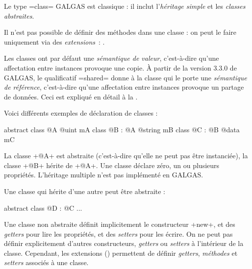 

Le type \ggs=class= GALGAS est classique : il inclut l'\emph{héritage simple} et les \emph{classes abstraites}.

Il n'est pas possible de définir des méthodes dans une classe : on peut le faire uniquement via des \emph{extensions}~: .

Les classes ont par défaut une \emph{sémantique de valeur}, c'est-à-dire qu'une affectation entre instances provoque une copie. À partir de la version 3.3.0 de GALGAS, le qualificatif \ggs=shared= donne à la classe qui le porte une \emph{sémantique de référence}, c'est-à-dire qu'une affectation entre instances provoque un partage de données. Ceci est expliqué en détail à la .










Voici différents exemples de déclaration de classes :

\begin{galgas}
abstract class @A {
  @uint mA
}
class @B : @A {
  @string mB
}
class @C : @B {
  @data mC
}
\end{galgas}

La classe \ggs+@A+ est abstraite (c'est-à-dire qu'elle ne peut pas être instanciée), la classe \ggs+@B+ hérite de \ggs+@A+. Une classe déclare zéro, un ou plusieurs propriétés. L'héritage multiple n'est pas implémenté en GALGAS.

Une classe qui hérite d'une autre peut être abstraite :
\begin{galgas}
abstract class @D : @C {
  ...
 }
\end{galgas}

Une classe non abstraite définit implicitement le constructeur \ggs+new+, et des \emph{getters} pour lire les propriétés, et des \emph{setters} pour les écrire. On ne peut pas définir explicitement d'autres constructeurs, \emph{getters} ou \emph{setters} à l'intérieur de la classe. Cependant,  les extensions () permettent de définir \emph{getters}, \emph{méthodes} et \emph{setters} associés à une classe.











